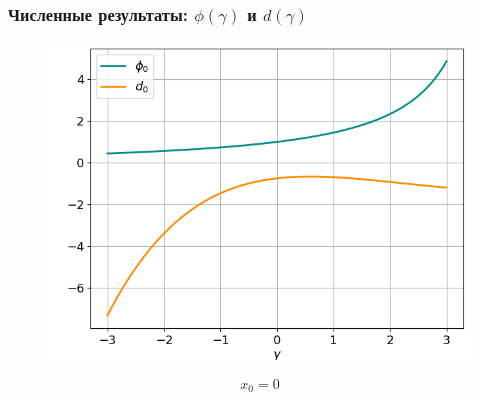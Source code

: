 \documentclass[fullscreen=true, unicode, bookmarks=false]{beamer}
\begin{document}
\begin{frame}
\frametitle{ Численные результаты: $ \phi(\gamma) $ и $ d(\gamma) $ }

\begin{figure} 
\includegraphics[scale=0.55]{divergent_phi0d0_0.png}  
\end{figure}

$$ x_0 = 0 $$

\end{frame}
\end{document}
